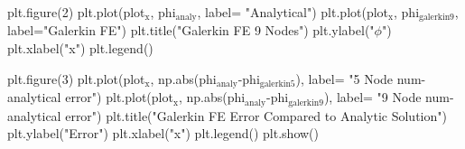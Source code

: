 \documentclass[11pt]{article}
\begin{document}
plt.figure(2)
plt.plot(plot$_{\text{x}}$, phi$_{\text{analy}}$, label= "Analytical")
plt.plot(plot$_{\text{x}}$, phi$_{\text{galerkin9}}$, label="Galerkin FE")
plt.title("Galerkin FE 9 Nodes")
plt.ylabel("$\phi$")
plt.xlabel("x")
plt.legend()

plt.figure(3)
plt.plot(plot$_{\text{x}}$, np.abs(phi$_{\text{analy}}$-phi$_{\text{galerkin5}}$), label= "5 Node num-analytical error")
plt.plot(plot$_{\text{x}}$, np.abs(phi$_{\text{analy}}$-phi$_{\text{galerkin9}}$), label= "9 Node num-analytical error")
plt.title("Galerkin FE Error Compared to Analytic Solution")
plt.ylabel("Error")
plt.xlabel("x")
plt.legend()
plt.show()
\end{document}

